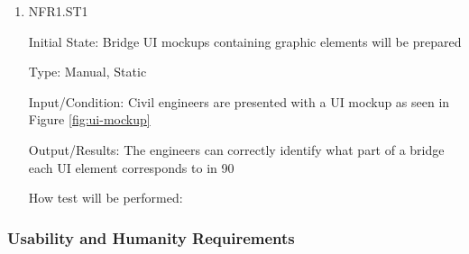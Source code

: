 \documentclass[12pt, titlepage]{article}
\begin{document}
\begin{enumerate}

\item{NFR1.ST1\\}

Initial State: Bridge UI mockups containing graphic elements will be prepared

Type: Manual, Static

Input/Condition: Civil engineers are presented with a UI mockup as seen in Figure \ref{fig:ui-mockup} 

Output/Results: The engineers can correctly identify what part of a bridge each UI element corresponds to in 90%

How test will be performed: 

\end{enumerate}

\subsubsection{Usability and Humanity Requirements}
		
\end{document}
